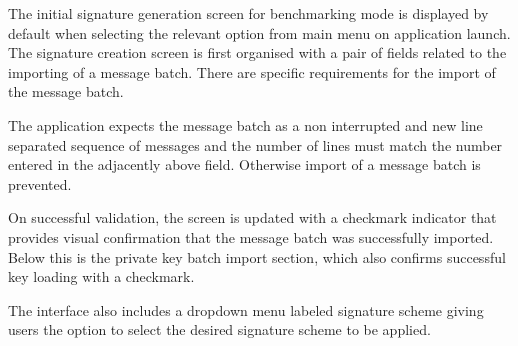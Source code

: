 \documentclass[]{final_report}
\begin{document}
The initial signature generation screen for benchmarking mode is displayed by default when selecting the relevant option from main menu on application launch.
The signature creation screen is first organised with a pair of fields related to the importing of a message batch. There are specific requirements for the import of the message batch. 

The application expects the message batch as a non interrupted and new line separated sequence of messages and the number of lines must match the number entered in the adjacently above field. Otherwise import of a message batch is prevented. 

On successful validation, the screen is updated with a checkmark indicator that provides visual confirmation that the message batch was successfully imported. Below this is the private key batch import section, which also confirms successful key loading with a checkmark.

The interface also includes a dropdown menu labeled signature scheme giving users the option to select the desired signature scheme  to be applied. 
\end{document}
